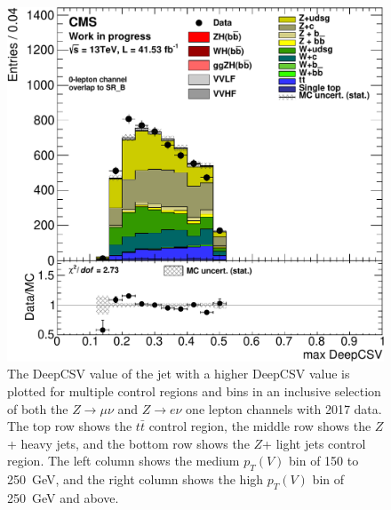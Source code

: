 \begin{figure}
  \includegraphics[width=0.42\linewidth]{figures/2017_Znn/Zlf_high_Znn__Hj0_DeepCSV_.pdf}
  \caption[Control region plots for zero lepton in 2017]{
    The DeepCSV value of the jet with a higher DeepCSV value
    is plotted for multiple control regions and bins in
    an inclusive selection of both the $Z\rightarrow \mu\nu$ and $Z\rightarrow e\nu$
    one lepton channels with 2017 data.
    The top row shows the $t\bar{t}$ control region,
    the middle row shows the $Z$+ heavy jets,
    and the bottom row shows the $Z$+ light jets control region.
    The left column shows the medium $p_T(V)$ bin of 150 to \SI{250}{GeV},
    and the right column shows the high $p_T(V)$ bin of \SI{250}{GeV} and above.
  }
  \label{fig:2017_Znn_j0csv}
\end{figure}

